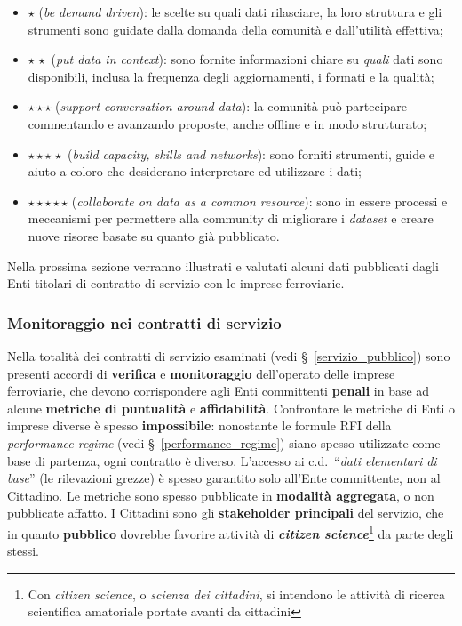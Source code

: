 \documentclass[12pt,italian]{report}
\begin{document}
\begin{itemize}
    \item $\star$ (\textit{be demand driven}): le scelte su quali dati
    rilasciare, la loro struttura e gli strumenti sono guidate dalla
    domanda della comunità e dall'utilità effettiva;
    \item $\star\,\star$ (\textit{put data in context}): sono fornite
    informazioni chiare su \textit{quali} dati sono disponibili,
    inclusa la frequenza degli aggiornamenti, i formati e la qualità;
    \item $\star \star \star$ (\textit{support conversation around
        data}): la comunità può partecipare commentando e avanzando
    proposte, anche offline e in modo strutturato;
    \item $\star \star \star\,\star$ (\textit{build capacity, skills
        and networks}): sono forniti strumenti, guide e aiuto a coloro
    che desiderano interpretare ed utilizzare i dati;
    \item $\star \star \star \star \star$ (\textit{collaborate on data
        as a common resource}): sono in essere processi e meccanismi
    per permettere alla community di migliorare i \textit{dataset} e
    creare nuove risorse basate su quanto già pubblicato.
\end{itemize}

Nella prossima sezione verranno illustrati e valutati alcuni dati
pubblicati dagli Enti titolari di contratto di servizio con le imprese
ferroviarie.

\subsubsection{Monitoraggio nei contratti di servizio}

Nella totalità dei contratti di servizio esaminati (vedi
\S~\ref{servizio_pubblico}) sono presenti accordi di \textbf{verifica}
e \textbf{monitoraggio} dell'operato delle imprese ferroviarie, che
devono corrispondere agli Enti committenti \textbf{penali} in base ad
alcune \textbf{metriche di puntualità} e \textbf{affidabilità}.
Confrontare le metriche di Enti o imprese diverse è spesso
\textbf{impossibile}: nonostante le formule RFI della
\textit{performance regime} (vedi \S~\ref{performance_regime}) siano
spesso utilizzate come base di partenza, ogni contratto è diverso.
L'accesso ai c.d.\ ``\textit{dati elementari di base}'' (le
rilevazioni grezze) è spesso garantito solo all'Ente committente, non
al Cittadino.  Le metriche sono spesso pubblicate in \textbf{modalità
    aggregata}, o non pubblicate affatto.  I Cittadini sono gli
\textbf{stakeholder principali} del servizio, che in quanto
\textbf{pubblico} dovrebbe favorire attività di
\textbf{\textit{citizen science}}\footnote{Con \textit{citizen
        science}, o \textit{scienza dei cittadini}, si intendono le
    attività di ricerca scientifica amatoriale portate avanti da
    cittadini} da parte degli stessi.
\end{document}
